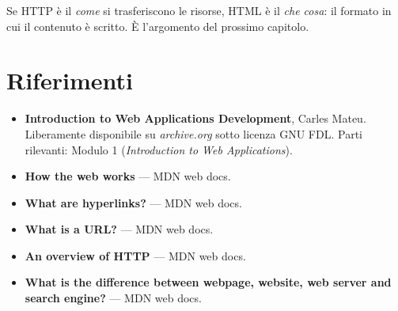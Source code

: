 Se HTTP è il \textit{come} si trasferiscono le risorse, HTML è il \textit{che
cosa}: il formato in cui il contenuto è scritto. È l'argomento del prossimo
capitolo.

\section{Riferimenti}

\begin{itemize}
  \item \textbf{Introduction to Web Applications Development}, Carles Mateu.
        Liberamente disponibile su \textit{archive.org} sotto licenza GNU FDL.
        Parti rilevanti: Modulo 1 (\textit{Introduction to Web Applications}).
  \item \textbf{How the web works} --- MDN web docs. \\
  \item \textbf{What are hyperlinks?} --- MDN web docs. \\
  \item \textbf{What is a URL?} --- MDN web docs. \\
  \item \textbf{An overview of HTTP} --- MDN web docs. \\
  \item \textbf{What is the difference between webpage, website, web server and
        search engine?} --- MDN web docs. \\
\end{itemize}

